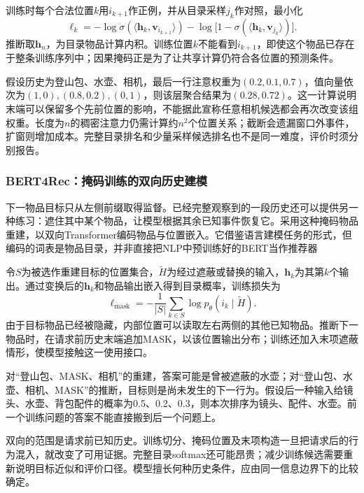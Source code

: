 训练时每个合法位置$k$用$i_{k+1}$作正例，并从目录采样$j_k$作对照，最小化
\begin{equation}
  \ell_k=-\log\sigma(\langle\bm{h}_k,\bm{v}_{i_{k+1}}\rangle)
  -\log\bigl[1-\sigma(\langle\bm{h}_k,\bm{v}_{j_k}\rangle)\bigr].
  \label{eq:rs-sasrec-loss}
\end{equation}
推断取$\bm{h}_n$，为目录物品计算内积。训练位置$k$不能看到$i_{k+1}$，即使这个物品已存在于整条训练序列中；因果掩码正是为了让共享计算仍符合各位置的预测条件。

假设历史为登山包、水壶、相机，最后一行注意权重为$(0.2,0.1,0.7)$，值向量依次为$(1,0),(0.8,0.2),(0,1)$，则该层聚合结果为$(0.28,0.72)$。这一计算说明末端可以保留多个先前位置的影响，不能据此宣称任意相机候选都会再次改变该组权重。长度为$n$的稠密注意力仍需计算约$n^2$个位置关系；截断会遗漏窗口外事件，扩窗则增加成本。完整目录排名和少量采样候选排名也不是同一难度，评价时须分别报告。

\subsubsection{BERT4Rec：掩码训练的双向历史建模}
\label{sec:rs-bert4rec}

下一物品目标只从左侧前缀取得监督。已经完整观察到的一段历史还可以提供另一种练习：遮住其中某个物品，让模型根据其余已知事件恢复它。采用这种掩码物品重建，以双向Transformer编码物品与位置嵌入。它借鉴语言建模任务的形式，但编码的词表是物品目录，并非直接把NLP中预训练好的BERT当作推荐器

令$S$为被选作重建目标的位置集合，$\widetilde H$为经过遮蔽或替换的输入，$\bm{h}_k$为其第$k$个输出。通过变换后的$\bm{h}_k$和物品输出嵌入得到目录概率，训练损失为
\begin{equation}
  \ell_{\mathrm{mask}}
    =-\frac{1}{|S|}\sum_{k\in S}
        \log p_\theta(i_k\mid\widetilde H).
  \label{eq:rs-bert4rec-mask}
\end{equation}
由于目标物品已经被隐藏，内部位置可以读取左右两侧的其他已知物品。推断下一物品时，在请求前历史末端追加MASK，以该位置输出分布；训练还加入末项遮蔽情形，使模型接触这一使用接口。

对“登山包、MASK、相机”的重建，答案可能是曾被遮蔽的水壶；对“登山包、水壶、相机、MASK”的推断，目标则是尚未发生的下一行为。假设后一种输入给镜头、水壶、背包配件的概率为0.5、0.2、0.3，则本次排序为镜头、配件、水壶。前一个训练问题的答案不能直接搬到后一个问题上。

双向的范围是请求前已知历史。训练切分、掩码位置及末项构造一旦把请求后的行为混入，就改变了可用证据。完整目录softmax还可能昂贵；减少训练候选需要重新说明目标近似和评价口径。模型擅长何种历史条件，应由同一信息边界下的比较确定。

